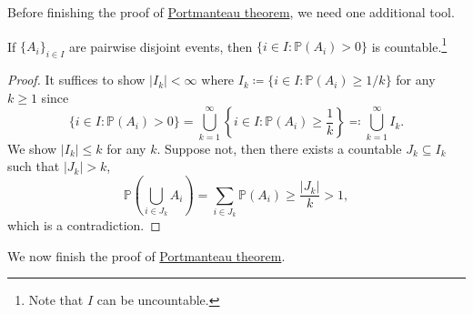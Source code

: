 Before finishing the proof of \hyperref[thm:Portmanteau]{Portmanteau theorem}, we need one additional tool.

\begin{lemma}\label{lma:countable-positive-disjoint-event}
	If \(\{ A_i \} _{i\in I}\) are pairwise disjoint events, then \(\{ i \in I \colon \mathbb{P} (A_i) > 0 \} \) is countable.\footnote{Note that \(I\) can be uncountable.}
\end{lemma}
\begin{proof}
	It suffices to show \(\vert I_k \vert < \infty \) where \(I_k \coloneqq \{ i \in I \colon \mathbb{P} (A_i) \geq 1 / k \}\) for any \(k \geq 1\) since
	\[
		\{ i \in I \colon \mathbb{P} (A_i) >0 \}
		= \bigcup_{k=1}^{\infty} \left\{ i \in I \colon \mathbb{P} (A_i) \geq \frac{1}{k} \right\}
		\eqqcolon \bigcup_{k=1}^{\infty} I_k.
	\]
	We show \(\vert I_k \vert \leq k\) for any \(k\). Suppose not, then there exists a countable \(J_k \subseteq I_k\) such that \(\vert J_k \vert > k\),
	\[
		\mathbb{P} \left( \bigcup_{i\in J_k} A_i \right)
		= \sum_{i\in J_k} \mathbb{P} (A_i)
		\geq \frac{\vert J_k \vert }{k}
		> 1,
	\]
	which is a contradiction.
\end{proof}

We now finish the proof of \hyperref[thm:Portmanteau]{Portmanteau theorem}.

